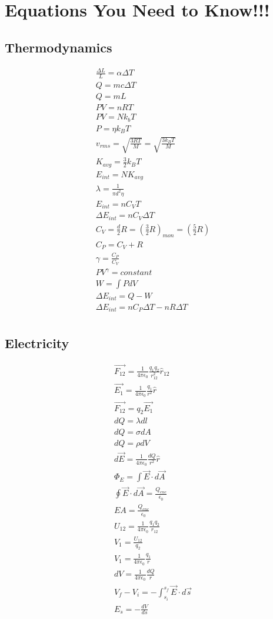 \section{Equations You Need to Know!!!}
\subsection{Thermodynamics}
\begin{align}
\frac{\Delta L}{L}=\alpha\Delta T\\
Q=mc\Delta T\\
Q=mL\\
PV=nRT\\
PV=Nk_bT\\
P=\eta k_BT\\
v_{rms}=\sqrt{\frac{3RT}{M}}=\sqrt{\frac{3k_BT}{M}}\\
K_{avg}=\frac{3}{2}k_BT\\
E_{int}=NK_{avg}\\
\lambda=\frac{1}{\pi d^2 \eta}\\
E_{int}=nC_VT\\
\Delta E_{int} = nC_V\Delta T\\
C_V=\frac{d}{2}R=\left(\frac{3}{2}R\right)_{mon}=\left(\frac{5}{2}R\right)\\
C_P=C_V+R\\
\gamma = \frac{C_P}{C_V}\\
PV^{\gamma}=constant\\
W=\int{PdV}\\
\Delta E_{int}=Q-W\\
\Delta E_{int}=nC_P\Delta T - nR\Delta T\\
\end{align}
\newpage

\subsection{Electricity}
\begin{align}
\vec{F_{12}}=\frac{1}{4\pi\epsilon_0}\frac{q_1q_2}{r_{12}^2}\hat{r}_{12}\\
\vec{E_1}=\frac{1}{4\pi\epsilon_0}\frac{q_1}{r^2}\hat{r}\\
\vec{F_{12}}=q_2\vec{E_1}\\
dQ=\lambda dl\\
dQ=\sigma dA\\
dQ=\rho dV\\
d\vec{E}=\frac{1}{4\pi\epsilon_0}\frac{dQ}{r^2}\hat{r}\\
\Phi_E=\int \vec{E}\cdot d\vec{A}\\
\oint\vec{E}\cdot d\vec{A}=\frac{Q_{enc}}{\epsilon_0}\\
EA=\frac{Q_{enc}}{\epsilon_0}\\
U_{12}=\frac{1}{4\pi\epsilon_0}\frac{q_1q_2}{r_{12}}\\
V_1=\frac{U_{12}}{q_2}\\
V_1=\frac{1}{4\pi\epsilon_0}\frac{q_1}{r}\\
dV=\frac{1}{4\pi\epsilon_0}\frac{dQ}{r}\\
V_f-V_i=-\int_{s_i}^{s_f}\vec{E}\cdot d\vec{s}\\
E_s=-\frac{dV}{ds}
\end{align}
\newpage
